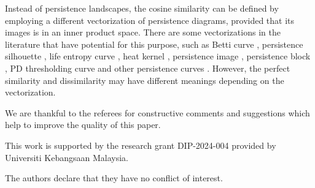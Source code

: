 \documentclass[sn-mathphys-num]{sn-jnl}%
\theoremstyle{thmstyleone}%
\theoremstyle{thmstyletwo}%
\theoremstyle{thmstylethree}%
\begin{document}
Instead of persistence landscapes, the cosine similarity can be defined by employing a different vectorization of persistence diagrams, provided that its images is in an inner product space. There are some vectorizations in the literature that have potential for this purpose, such as Betti curve \cite{Edelsbrunner}, persistence silhouette \cite{Chazal}, life entropy curve \cite{Atienza}, heat kernel \cite{Reininghaus}, persistence image \cite{Adam}, persistence block \cite{Chan}, PD thresholding curve \cite{Chung-Day} and other persistence curves \cite{Chung-Lawson}. However, the perfect similarity and dissimilarity may have different meanings depending on the vectorization.

\backmatter

We are thankful to the referees for constructive comments and suggestions which help to improve the quality of this paper.

This work is supported by the research grant DIP-2024-004 provided by Universiti Kebangsaan Malaysia.

The authors declare that they have no conflict of interest.

%
%

\end{document}
